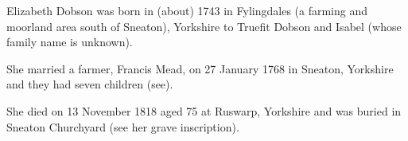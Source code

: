 
Elizabeth Dobson was born in (about) 1743 in Fylingdales (a farming and moorland area south of Sneaton), Yorkshire to Truefit Dobson and Isabel (whose family name is unknown). 

She married a farmer, Francis Mead, on 27 January 1768 in	Sneaton, Yorkshire and they had seven children (see).

She died on 13 November 1818 aged 75 at Ruswarp, Yorkshire and was buried in Sneaton Churchyard (see her grave inscription).\cite{FMeadDeath}

